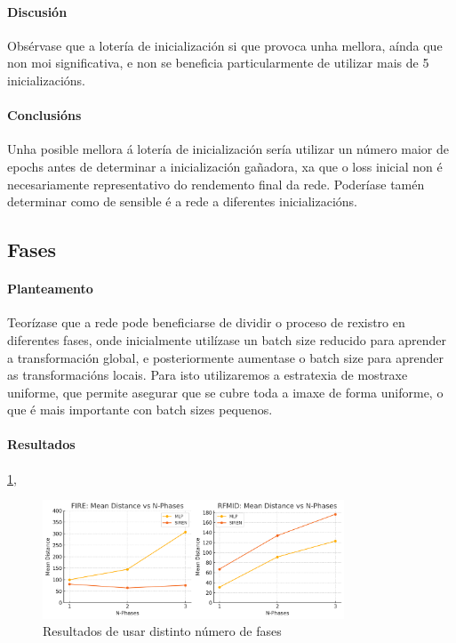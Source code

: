 \paragraph{Discusión}
\label{par:Discusion-initialization}

Obsérvase que a lotería de inicialización si que provoca unha mellora, aínda que non moi significativa, e non se beneficia particularmente de utilizar mais de 5 inicializacións.

\paragraph{Conclusións}
\label{par:Conclusions-initialization}

Unha posible mellora á lotería de inicialización sería utilizar un número maior de epochs antes de determinar a inicialización gañadora, xa que o loss inicial non é necesariamente representativo do rendemento final da rede.
Poderíase tamén determinar como de sensible é a rede a diferentes inicializacións.

\subsection{Fases}
\label{subsec:Fases}
\paragraph{Planteamento}
\label{par:Planteamento-phases}

Teorízase que a rede pode beneficiarse de dividir o proceso de rexistro en diferentes fases, onde inicialmente utilízase un batch size reducido para aprender a transformación global, e posteriormente aumentase o batch size para aprender as transformacións locais.
Para isto utilizaremos a estratexia de mostraxe uniforme, que permite asegurar que se cubre toda a imaxe de forma uniforme, o que é mais importante con batch sizes pequenos.

\paragraph{Resultados}
\label{par:Resultados-phases}

\ref{fig:nphases}, 
\begin{figure}[ht]
    \centering
    \includegraphics[width=0.8\textwidth]{imaxes/lottery/nphases.png}
    \caption{Resultados de usar distinto número de fases}
    \label{fig:nphases}
\end{figure}

